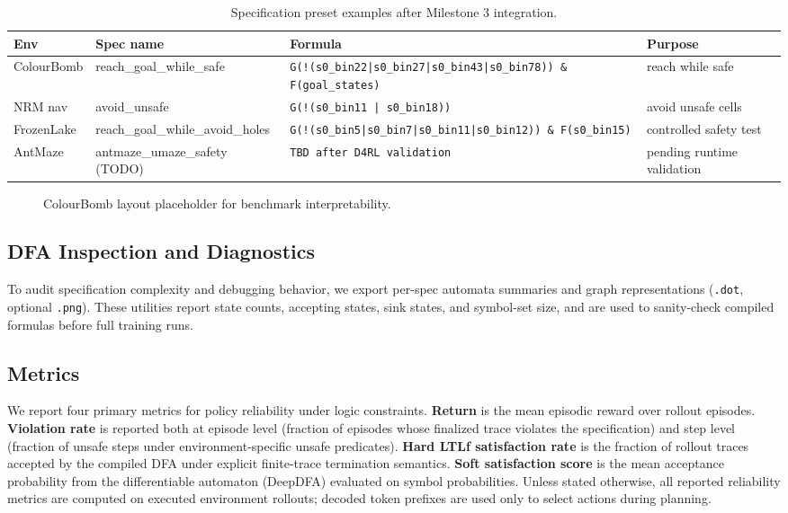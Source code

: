 \documentclass[runningheads]{llncs}
\begin{document}
\begin{table}[t]
\caption{Specification preset examples after Milestone 3 integration.}
\label{tab:spec_presets}
\centering
\small
\begin{tabular}{llll}
\hline
Env & Spec name & Formula & Purpose \\
\hline
ColourBomb & reach\_goal\_while\_safe & \texttt{G(!(s0\_bin22|s0\_bin27|s0\_bin43|s0\_bin78)) \& F(goal\_states)} & reach while safe \\
NRM nav & avoid\_unsafe & \texttt{G(!(s0\_bin11 | s0\_bin18))} & avoid unsafe cells \\
FrozenLake & reach\_goal\_while\_avoid\_holes & \texttt{G(!(s0\_bin5|s0\_bin7|s0\_bin11|s0\_bin12)) \& F(s0\_bin15)} & controlled safety test \\
AntMaze & antmaze\_umaze\_safety (TODO) & \texttt{TBD after D4RL validation} & pending runtime validation \\
\hline
\end{tabular}
\end{table}

\begin{figure}[t]
\centering
{}
\caption{ColourBomb layout placeholder for benchmark interpretability.}
\label{fig:cb_layout}
\end{figure}

\subsection{DFA Inspection and Diagnostics}
To audit specification complexity and debugging behavior, we export per-spec automata summaries and graph representations (\texttt{.dot}, optional \texttt{.png}). These utilities report state counts, accepting states, sink states, and symbol-set size, and are used to sanity-check compiled formulas before full training runs.

\subsection{Metrics}
We report four primary metrics for policy reliability under logic constraints. \textbf{Return} is the mean episodic reward over rollout episodes. \textbf{Violation rate} is reported both at episode level (fraction of episodes whose finalized trace violates the specification) and step level (fraction of unsafe steps under environment-specific unsafe predicates). \textbf{Hard LTLf satisfaction rate} is the fraction of rollout traces accepted by the compiled DFA under explicit finite-trace termination semantics. \textbf{Soft satisfaction score} is the mean acceptance probability from the differentiable automaton (DeepDFA) evaluated on symbol probabilities. Unless stated otherwise, all reported reliability metrics are computed on executed environment rollouts; decoded token prefixes are used only to select actions during planning.
\end{document}
